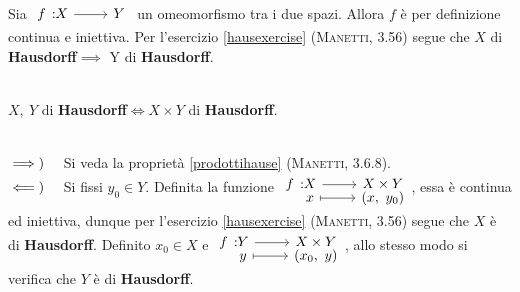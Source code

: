 \begin{demonstration}
Sia $\funz{f}{X}{Y}$ un omeomorfismo tra i due spazi. Allora $f$ è per definizione continua e iniettiva. Per l'esercizio \ref{hausexercise} \textsc{(Manetti, 3.56)} segue che $X$ di \textbf{Hausdorff}$\implies$ Y di \textbf{Hausdorff}.
\end{demonstration}
\begin{theorema}~{}\\
$X,\ Y$ di \textbf{Hausdorff}$\iff X\times Y$ di \textbf{Hausdorff}.
\end{theorema}
\begin{demonstration}~{}\\
$\implies)\quad$ Si veda la proprietà \ref{prodottihause} \textsc{(Manetti, 3.6.8)}.\\
$\impliedby)\quad$ Si fissi $y_0\in Y$. Definita la funzione $\funztot{f}{X}{X\times Y}{x}{\left(x,\ y_0\right)}$, essa è continua ed iniettiva, dunque per l'esercizio \ref{hausexercise} \textsc{(Manetti, 3.56)} segue che $X$ è di \textbf{Hausdorff}. Definito $x_0\in X$ e $\funztot{f}{Y}{X\times Y}{y}{\left(x_0,\ y\right)}$, allo stesso modo si verifica che $Y$ è di \textbf{Hausdorff}.
\end{demonstration}